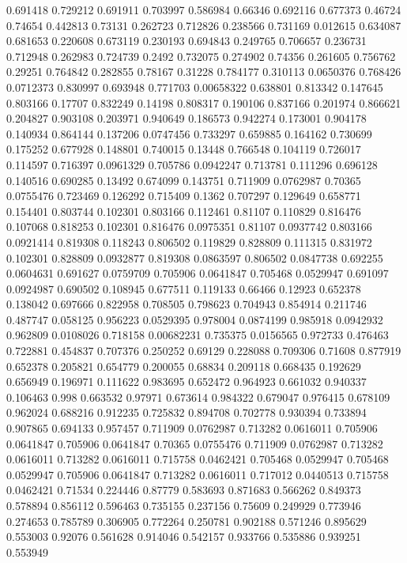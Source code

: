 0.691418 0.729212
0.691911 0.703997
0.586984 0.66346
0.692116 0.677373
0.46724 0.74654
0.442813 0.73131
0.262723 0.712826
0.238566 0.731169
0.012615 0.634087
0.681653 0.220608
0.673119 0.230193
0.694843 0.249765
0.706657 0.236731
0.712948 0.262983
0.724739 0.2492
0.732075 0.274902
0.74356 0.261605
0.756762 0.29251
0.764842 0.282855
0.78167 0.31228
0.784177 0.310113
0.0650376 0.768426
0.0712373 0.830997
0.693948 0.771703
0.00658322 0.638801
0.813342 0.147645
0.803166 0.17707
0.832249 0.14198
0.808317 0.190106
0.837166 0.201974
0.866621 0.204827
0.903108 0.203971
0.940649 0.186573
0.942274 0.173001
0.904178 0.140934
0.864144 0.137206
0.0747456 0.733297
0.659885 0.164162
0.730699 0.175252
0.677928 0.148801
0.740015 0.13448
0.766548 0.104119
0.726017 0.114597
0.716397 0.0961329
0.705786 0.0942247
0.713781 0.111296
0.696128 0.140516
0.690285 0.13492
0.674099 0.143751
0.711909 0.0762987
0.70365 0.0755476
0.723469 0.126292
0.715409 0.1362
0.707297 0.129649
0.658771 0.154401
0.803744 0.102301
0.803166 0.112461
0.81107 0.110829
0.816476 0.107068
0.818253 0.102301
0.816476 0.0975351
0.81107 0.0937742
0.803166 0.0921414
0.819308 0.118243
0.806502 0.119829
0.828809 0.111315
0.831972 0.102301
0.828809 0.0932877
0.819308 0.0863597
0.806502 0.0847738
0.692255 0.0604631
0.691627 0.0759709
0.705906 0.0641847
0.705468 0.0529947
0.691097 0.0924987
0.690502 0.108945
0.677511 0.119133
0.66466 0.12923
0.652378 0.138042
0.697666 0.822958
0.708505 0.798623
0.704943 0.854914
0.211746 0.487747
0.058125 0.956223
0.0529395 0.978004
0.0874199 0.985918
0.0942932 0.962809
0.0108026 0.718158
0.00682231 0.735375
0.0156565 0.972733
0.476463 0.722881
0.454837 0.707376
0.250252 0.69129
0.228088 0.709306
0.71608 0.877919
0.652378 0.205821
0.654779 0.200055
0.68834 0.209118
0.668435 0.192629
0.656949 0.196971
0.111622 0.983695
0.652472 0.964923
0.661032 0.940337
0.106463 0.998
0.663532 0.97971
0.673614 0.984322
0.679047 0.976415
0.678109 0.962024
0.688216 0.912235
0.725832 0.894708
0.702778 0.930394
0.733894 0.907865
0.694133 0.957457
0.711909 0.0762987
0.713282 0.0616011
0.705906 0.0641847
0.705906 0.0641847
0.70365 0.0755476
0.711909 0.0762987
0.713282 0.0616011
0.713282 0.0616011
0.715758 0.0462421
0.705468 0.0529947
0.705468 0.0529947
0.705906 0.0641847
0.713282 0.0616011
0.717012 0.0440513
0.715758 0.0462421
0.71534 0.224446
0.87779 0.583693
0.871683 0.566262
0.849373 0.578894
0.856112 0.596463
0.735155 0.237156
0.75609 0.249929
0.773946 0.274653
0.785789 0.306905
0.772264 0.250781
0.902188 0.571246
0.895629 0.553003
0.92076 0.561628
0.914046 0.542157
0.933766 0.535886
0.939251 0.553949
